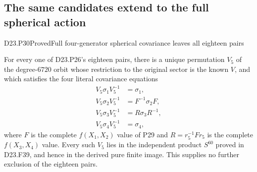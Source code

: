 \subsection{The same candidates extend to the full spherical action}

\begin{statement}{D23.P30}{Proved}{Full four-generator spherical covariance leaves all eighteen pairs}
\end{statement}
For every one of D23.P26's eighteen pairs, there is a
unique permutation $V_5$ of the degree-$6720$ orbit
whose restriction to the original sector is the known
$V$, and which satisfies the four literal covariance
equations
\[
\begin{split}
 V_5\sigma_1V_5^{-1}&=\sigma_1,\\
 V_5\sigma_2V_5^{-1}&=F^{-1}\sigma_2F,\\
 V_5\sigma_3V_5^{-1}&=R\sigma_3R^{-1},\\
 V_5\sigma_4V_5^{-1}&=\sigma_4,
\end{split}
\]
where $F$ is the complete $f(X_1,X_2)$ value of P29
and $R=r_5^{-1}Fr_5$ is the complete $f(X_3,X_4)$
value. Every such $V_5$ lies in the independent product
$S^{60}$ proved in D23.F39, and hence in the derived
pure finite image. This supplies no further exclusion
of the eighteen pairs.

